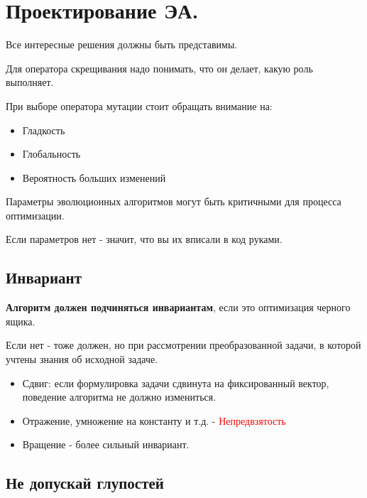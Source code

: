 \section{Проектирование ЭА.}

Все интересные решения должны быть представимы.

Для оператора скрещивания надо понимать, что он делает,
какую роль выполняет.

При выборе оператора мутации стоит обращать внимание на:
\begin{itemize}
    \item Гладкость
    \item Глобальность
    \item Вероятность больших изменений
\end{itemize}

Параметры эволюционных алгоритмов могут быть критичными для
процесса оптимизации.

Если параметров нет - значит, что вы их вписали в код руками.

\subsection*{Инвариант}

\textbf{Алгоритм должен подчиняться инвариантам}, если это
оптимизация черного ящика.

Если нет - тоже должен, но при рассмотрении преобразованной
задачи, в которой учтены знания об исходной задаче.

\begin{itemize}
    \item Сдвиг: если формулировка задачи сдвинута на фиксированный
    вектор, поведение алгоритма не должно измениться.
    \item Отражение, умножение на константу и т.д. -
    \textcolor{red}{Непредвзятость}
    \item Вращение - более сильный инвариант.
\end{itemize}

\subsection*{Не допускай глупостей}

